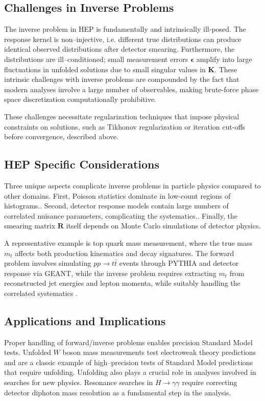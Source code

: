 \subsection{Challenges in Inverse Problems}
The inverse problem in HEP is fundamentally and intrinsically ill-posed.
%
The response kernel is non--injective, i.e. different true distributions can produce identical observed distributions after detector smearing.
%
Furthermore, the distributions are ill--conditioned; small measurement errors \(\boldsymbol{\epsilon}\) amplify into large fluctuations in unfolded solutions due to small singular values in \(\mathbf{K}\).
%
These intrinsic challenges with inverse problems are compounded by the fact that modern analyses involve a large number of observables, making brute-force phase space discretization computationally prohibitive.


These challenges necessitate regularization techniques that impose physical constraints on solutions, such as Tikhonov regularization or iteration cut-offs before convergence, described above.

\subsection{HEP Specific Considerations}

Three unique aspects complicate inverse problems in particle physics compared to other domains.
%
First, Poisson statistics dominate in low-count regions of histograms..
%
Second, detector response models contain large numbers of correlated nuisance parameters, complicating the systematics..
%
Finally, the smearing matrix \(\mathbf{R}\) itself depends on Monte Carlo simulations of detector physics.

A representative example is top quark mass measurement, where the true mass \(m_t\) affects both production kinematics and decay signatures.
%
The forward problem involves simulating \(pp \to t\bar{t}\) events through PYTHIA and detector response via GEANT, while the inverse problem requires extracting \(m_t\) from reconstructed jet energies and lepton momenta, while suitably handling the correlated systematics .

\subsection{Applications and Implications}

Proper handling of forward/inverse problems enables precision Standard Model tests.
%
Unfolded \(W\) boson mass measurements test electroweak theory predictions and are a classic example of high--precision tests of Standard Model predictions that require unfolding.
%
Unfolding also plays a crucial role in analyses involved in searches for new physics. Resonance searches in \(H \to \gamma\gamma\) require correcting detector diphoton mass resolution as a fundamental step in the analysis.

